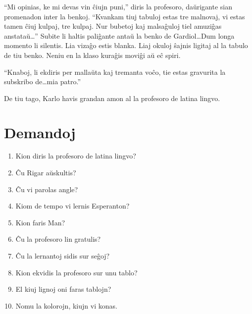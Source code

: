 ``Mi opinias, ke mi devas vin ĉiujn puni,'' diris la profesoro, daŭrigante sian promenadon inter la benkoj. ``Kvankam tiuj tabuloj estas tre malnovaj, vi estas tamen ĉiuj kulpaj, tre kulpaj. Nur bubetoj kaj malsaĝuloj tiel amuziĝas anstataŭ\ldots{}'' Subite li haltis paliĝante antaŭ la benko de Gardiol\ldots{}Dum longa momento li silentis. Lia vizaĝo estis blanka. Liaj okuloj ŝajnis ligitaj al la tabulo de tiu benko. Neniu en la klaso kuraĝis moviĝi aŭ eĉ spiri.

``Knaboj, li ekdiris per mallaŭta kaj tremanta voĉo, tie estas gravurita la subskribo de\ldots{}mia patro.''

De tiu tago, Karlo havis grandan amon al la profesoro de latina lingvo.

\newpage

\section*{Demandoj}

\begin{enumerate}
    \item  Kion diris la profesoro de latina lingvo?
    \item  Ĉu Rigar aŭskultis?
    \item  Ĉu vi parolas angle?
    \item  Kiom de tempo vi lernis Esperanton?
    \item  Kion faris Man?
    \item  Ĉu la profesoro lin gratulis?
    \item  Ĉu la lernantoj sidis sur seĝoj?
    \item  Kion ekvidis la profesoro sur unu tablo?
    \item  El kiuj lignoj oni faras tablojn?
    \item  Nomu la kolorojn, kiujn vi konas.
\end{enumerate}
